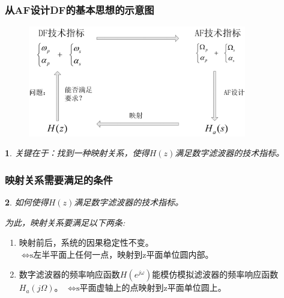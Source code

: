 \documentclass[notheorems,compress,mathserif,table]{beamer}
\newtheorem{dablock}{}
\begin{document}
\begin{frame}\frametitle{\quad\quad\quad\quad\quad
从AF设计DF的基本思想的示意图
}%
  \begin{figure}[h]
    \centering
    \includegraphics[width=0.85\textwidth]{fig11_afdfshejisilu.jpg}
  \end{figure}
  \begin{dablock}
      关键在于：找到一种映射关系，使得$H(z)$满足数字滤波器的技术指标。
  \end{dablock}
\end{frame}
%



\begin{frame}[shrink]\frametitle{映射关系需要满足的条件}%
  \begin{dablock}
      如何使得$H(z)$满足数字滤波器的技术指标。\par
      为此，映射关系要满足以下两条:\par
  \end{dablock}

\begin{enumerate}
    \item [1] 映射前后，系统的因果稳定性不变。
    \newline
    $\Longleftrightarrow \mbox{s左半平面上任何一点，映射到z平面单位圆内部。}$
    \newline
    \item [2] 数字滤波器的频率响应函数$H(e^{j\omega})$能模仿模拟滤波器的频率响应函数$H_a(j\Omega)$。
    \newline
    $\Longleftrightarrow \mbox{s平面虚轴上的点映射到z平面单位圆上。}$
    \newline
  \end{enumerate}
\end{frame}
%
%
\end{document}
